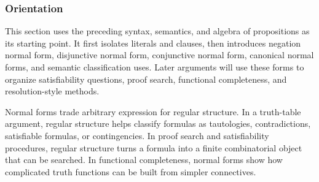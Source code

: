\subsubsection*{Orientation}

\begin{remark*}
This section uses the preceding syntax, semantics, and algebra of propositions
as its starting point. It first isolates literals and clauses, then introduces
negation normal form, disjunctive normal form, conjunctive normal form,
canonical normal forms, and semantic classification uses. Later arguments
will use these forms to organize satisfiability questions, proof search,
functional completeness, and resolution-style methods.
\end{remark*}

\begin{remark*}
Normal forms trade arbitrary expression for regular structure. In a truth-table
argument, regular structure helps classify formulas as tautologies,
contradictions, satisfiable formulas, or contingencies. In proof search and
satisfiability procedures, regular structure turns a formula into a finite
combinatorial object that can be searched. In functional completeness, normal
forms show how complicated truth functions can be built from simpler
connectives.
\end{remark*}
